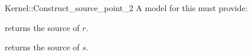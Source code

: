 \begin{ccRefFunctionObjectConcept}{Kernel::Construct_source_point_2}
A model for this must provide:


{returns the source of $r$.}

{returns the source of $s$.}

\end{ccRefFunctionObjectConcept}
